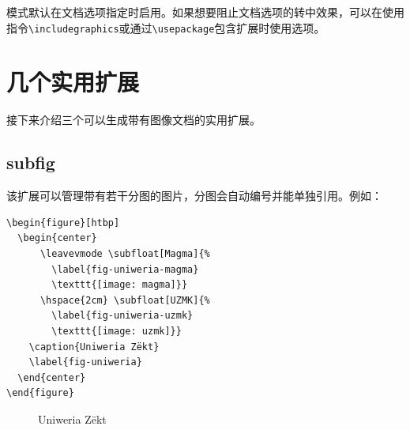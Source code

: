 模式默认在文档选项指定时启用。如果想要阻止文档选项的转中效果，可以在使用指令\verb|\includegraphics|或通过\verb|\usepackage|包含扩展时使用选项。

\section{几个实用扩展}

接下来介绍三个可以生成带有图像文档的实用扩展。

\subsection{\textsf{subfig}}

该扩展可以管理带有若干分图的图片，分图会自动编号并能单独引用。例如：

\begin{dmd}
\begin{verbatim}
\begin{figure}[htbp]
  \begin{center}
      \leavevmode \subfloat[Magma]{%
        \label{fig-uniweria-magma}
        \texttt{[image: magma]}}
      \hspace{2cm} \subfloat[UZMK]{%
        \label{fig-uniweria-uzmk}
        \texttt{[image: uzmk]}}
    \caption{Uniweria Zëkt}
    \label{fig-uniweria}
  \end{center}
\end{figure}\end{verbatim}
\end{dmd}

\begin{figure}[htbp]
  \begin{center}
      \leavevmode {}
      \hspace{2cm} 
    \caption{Uniweria Zëkt}
    \label{fig-uniweria}
  \end{center}
\end{figure}

